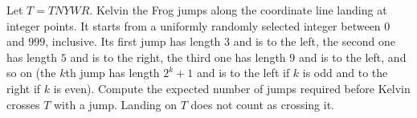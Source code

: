 Let $T=TNYWR$. Kelvin the Frog jumps along the coordinate line landing at integer points. It starts from a uniformly randomly selected integer between $0$ and $999$, inclusive. Its first jump has length $3$ and is to the left, the second one has length $5$ and is to the right, the third one has length $9$ and is to the left, and so on (the $k$th jump has length $2^k+1$ and is to the left if $k$ is odd and to the right if $k$ is even). Compute the expected number of jumps required before Kelvin crosses $T$ with a jump. Landing on $T$ does not count as crossing it.